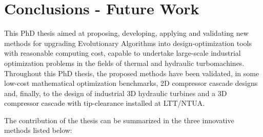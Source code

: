 
\chapter{Conclusions - Future Work} %



\ifpdf
    \graphicspath{{7/figures/PNG/}{7/figures/PDF/}{7/figures/}}
\else
    \graphicspath{{7/figures/EPS/}{7/figures/}}
\fi


This PhD thesis aimed at proposing, developing, applying and validating new methods for upgrading Evolutionary Algorithms into design-optimization tools with reasonable computing cost, capable to undertake large-scale industrial optimization problems in the fields of thermal and hydraulic turbomachines. Throughout this PhD thesis, the proposed methods have been validated, in some low-cost mathematical optimization benchmarks, 2D compressor cascade designs and, finally, to the design of industrial 3D hydraulic turbines and a 3D compressor cascade with tip-clearance installed at LTT/NTUA. 

The contribution of the thesis can be summarized in the three innovative methods listed below:

